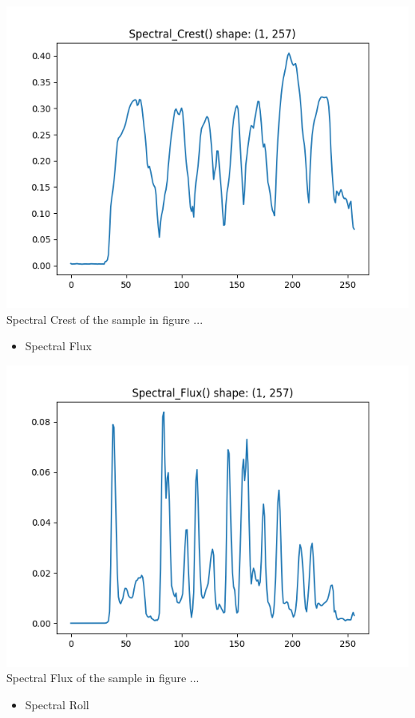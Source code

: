 \documentclass[11pt]{article}
\begin{document}
\begin{center}
\includegraphics[width=.9\linewidth]{./Figures/Spectral_Crest.png}
Spectral Crest of the sample in figure ...
\end{center}
\begin{itemize}
\item Spectral Flux
\end{itemize}
\begin{center}
\includegraphics[width=.9\linewidth]{./Figures/Spectral_Flux.png}
Spectral Flux of the sample in figure ...
\end{center}
\begin{itemize}
\item Spectral Roll
\end{itemize}
\end{document}
